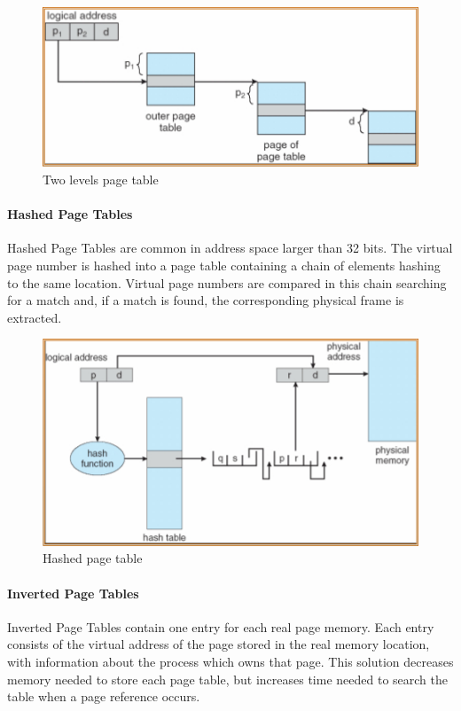 \begin{figure}[hbtp]
\centering
\includegraphics[scale=0.4]{images/memory_management/two_levels_pagetable.jpg}
\caption{Two levels page table}
\end{figure}

\paragraph{Hashed Page Tables}
Hashed Page Tables are common in address space larger than 32 bits. The virtual page number is hashed into a page table containing a chain of elements hashing to the same location. Virtual page numbers are compared in this chain searching for a match and, if a match is found, the corresponding physical frame is extracted.

\begin{figure}[hbtp]
\centering
\includegraphics[scale=0.4]{images/memory_management/hashed_pagetable.jpg}
\caption{Hashed page table}
\end{figure}

\paragraph{Inverted Page Tables}
Inverted Page Tables contain one entry for each real page memory. Each entry consists of the virtual address of the page stored in the real memory location, with information about the process which owns that page. This solution decreases memory needed to store each page table, but increases time needed to search the table when a page reference occurs.

